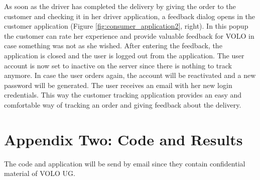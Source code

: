 As soon as the driver has completed the delivery by giving the order to the customer and checking it in her driver application, a feedback dialog opens in the customer application (Figure \ref{fig:consumer_application2}, right). In this popup the customer can rate her experience and provide valuable feedback for VOLO in case something was not as she wished.\newline
After entering the feedback, the application is closed and the user is logged out from the application. The user account is now set to inactive on the server since there is nothing to track anymore. In case the user orders again, the account will be reactivated and a new password will be generated. The user receives an email with her new login credentials.\newline
This way the customer tracking application provides an easy and comfortable way of tracking an order and giving feedback about the delivery.
\newpage
\section{Appendix Two: Code and Results}\label{section:Appendix Two: Code and Results}

The code and application will be send by email since they contain confidential material of VOLO UG.
